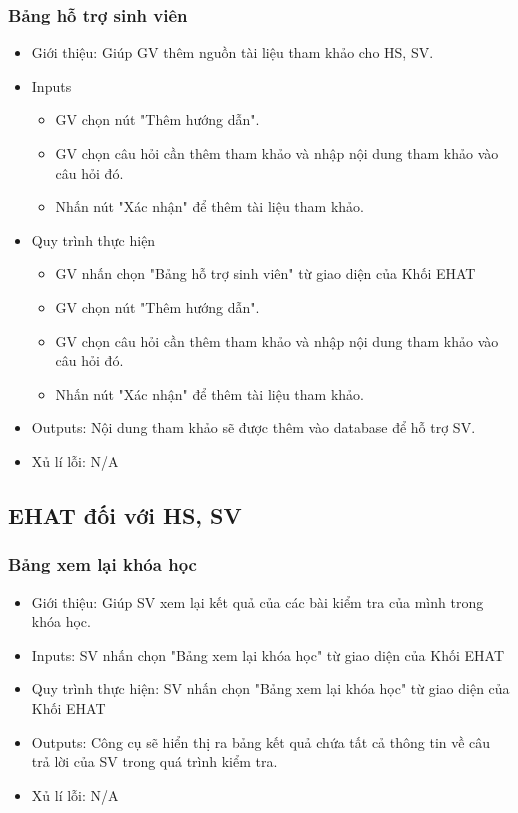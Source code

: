 \subsubsection{Bảng hỗ trợ sinh viên}
\begin{itemize}
	\item Giới thiệu: Giúp GV thêm nguồn tài liệu tham khảo cho HS, SV.
	\item Inputs
	\begin{itemize}
		\item GV chọn nút "Thêm hướng dẫn".
		\item GV chọn câu hỏi cần thêm tham khảo và nhập nội dung tham khảo vào câu hỏi đó.
		\item Nhấn nút "Xác nhận" để thêm tài liệu tham khảo.
	\end{itemize}
	\item Quy trình thực hiện
	\begin{itemize}
		\item GV nhấn chọn "Bảng hỗ trợ sinh viên" từ giao diện của Khối EHAT
		\item GV chọn nút "Thêm hướng dẫn".
		\item GV chọn câu hỏi cần thêm tham khảo và nhập nội dung tham khảo vào câu hỏi đó.
		\item Nhấn nút "Xác nhận" để thêm tài liệu tham khảo.
	\end{itemize}
	\item Outputs: Nội dung tham khảo sẽ được thêm vào database để hỗ trợ SV.
	\item Xủ lí lỗi: N/A
\end{itemize}

\subsection{EHAT đối với HS, SV}
\subsubsection{Bảng xem lại khóa học}
\begin{itemize}
	\item Giới thiệu: Giúp SV xem lại kết quả của các bài kiểm tra của mình trong khóa học.
	\item Inputs: SV nhấn chọn "Bảng xem lại khóa học" từ giao diện của Khối EHAT
	\item Quy trình thực hiện: SV nhấn chọn "Bảng xem lại khóa học" từ giao diện của Khối EHAT
	\item Outputs: Công cụ sẽ hiển thị ra bảng kết quả chứa tất cả thông tin về câu trả lời của SV trong quá trình kiểm tra.
	\item Xủ lí lỗi: N/A
\end{itemize}
